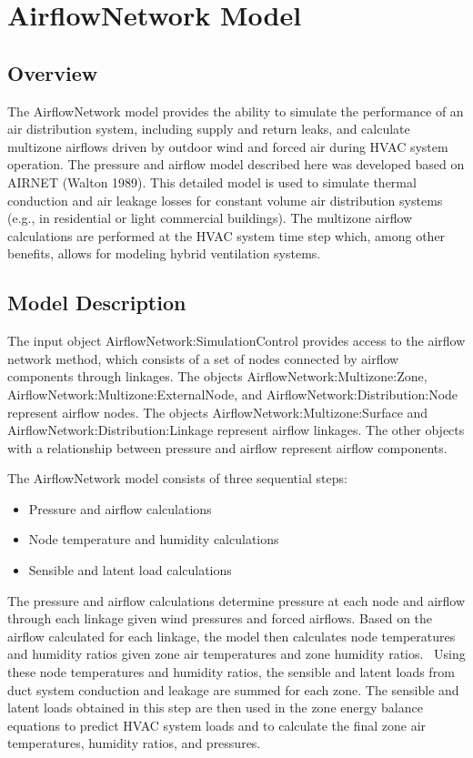 \section{AirflowNetwork Model}\label{airflownetwork-model}

\subsection{Overview}\label{afn-overview}

The AirflowNetwork model provides the ability to simulate the performance of an air distribution system, including supply and return leaks, and calculate multizone airflows driven by outdoor wind and forced air during HVAC system operation. The pressure and airflow model described here was developed based on AIRNET (Walton 1989). This detailed model is used to simulate thermal conduction and air leakage losses for constant volume air distribution systems (e.g., in residential or light commercial buildings). The multizone airflow calculations are performed at the HVAC system time step which, among other benefits, allows for modeling hybrid ventilation systems.

\subsection{Model Description}\label{afn-model-description}

The input object AirflowNetwork:SimulationControl provides access to the airflow network method, which consists of a set of nodes connected by airflow components through linkages. The objects AirflowNetwork:Multizone:Zone, AirflowNetwork:Multizone:ExternalNode, and AirflowNetwork:Distribution:Node represent airflow nodes. The objects AirflowNetwork:Multizone:Surface and AirflowNetwork:Distribution:Linkage represent airflow linkages. The other objects with a relationship between pressure and airflow represent airflow components.

The AirflowNetwork model consists of three sequential steps:

\begin{itemize}
\item
  Pressure and airflow calculations
\item
  Node temperature and humidity calculations
\item
  Sensible and latent load calculations
\end{itemize}

The pressure and airflow calculations determine pressure at each node and airflow through each linkage given wind pressures and forced airflows. Based on the airflow calculated for each linkage, the model then calculates node temperatures and humidity ratios given zone air temperatures and zone humidity ratios.~ Using these node temperatures and humidity ratios, the sensible and latent loads from duct system conduction and leakage are summed for each zone. The sensible and latent loads obtained in this step are then used in the zone energy balance equations to predict HVAC system loads and to calculate the final zone air temperatures, humidity ratios, and pressures.

